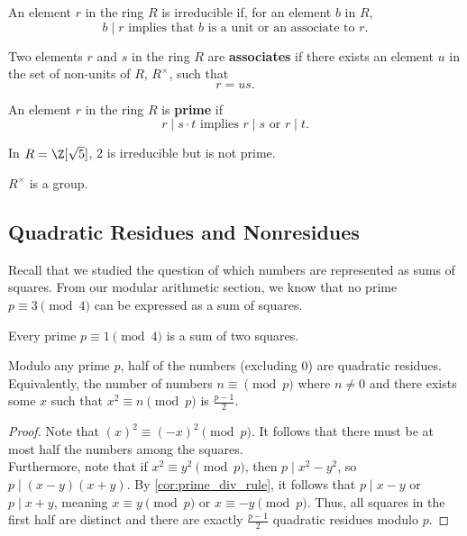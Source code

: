 \documentclass[11pt]{article}
\begin{document}
\begin{definition}[Irreducible]
An element $r$ in the ring $R$ is irreducible if, for an element $b$ in $R$, 
\[
    b \mid r \text{ implies that } b \text { is a unit or an associate to } r.
\]
\end{definition}

\begin{definition}[Associates]
Two elements $r$ and $s$ in the ring $R$ are \textbf{associates} if there exists an element $u$ in the set of non-units of $R$, $R^{\times}$, such that
\[
    r = us.
\]
\end{definition}

\begin{definition}[Prime]
An element $r$ in the ring $R$ is \textbf{prime} if 
\[
    r \mid s \cdot t \text{ implies } r \mid s \text{ or } r \mid t.
\]
\end{definition}

\begin{remark} 
In $R = \Z[\sqrt{5}]$, $2$ is irreducible but is not prime.
\end{remark}

\begin{exercise}
$R^{\times}$ is a group.    
\end{exercise}

\subsection{Quadratic Residues and Nonresidues}

Recall that we studied the question of which numbers are represented as sums of squares. 
From our modular arithmetic section, we know that no prime $p \equiv 3 \pmod 4$ can be expressed as a sum of squares.

\begin{lemma}
Every prime $p \equiv 1 \pmod 4$ is a sum of two squares.
\end{lemma}

\begin{lemma}
Modulo any prime $p$, half of the numbers (excluding $0$) are quadratic residues. \\

Equivalently, the number of numbers $n \equiv \pmod p$ where
$n \neq 0$ and there exists some $x$ such that $x^2 \equiv n \pmod p$ is $\frac{p-1}{2}.$
\end{lemma}

\begin{proof}
Note that $(x)^2 \equiv (-x)^2 \pmod p$. It follows that there must be at most half the numbers among the squares. \\

Furthermore, note that if $x^2 \equiv y^2 \pmod p$, then $p \mid x^2 - y^2$, so $p \mid (x-y)(x+y)$. By \cref{cor:prime_div_rule}, it follows that
$p \mid x-y$ or $p \mid x+y$, meaning $x \equiv y \pmod p$ or $x \equiv -y \pmod p$. Thus, all squares in the first half are distinct and there are exactly
$\frac{p-1}{2}$ quadratic residues modulo $p$.
\end{proof}
\end{document}
